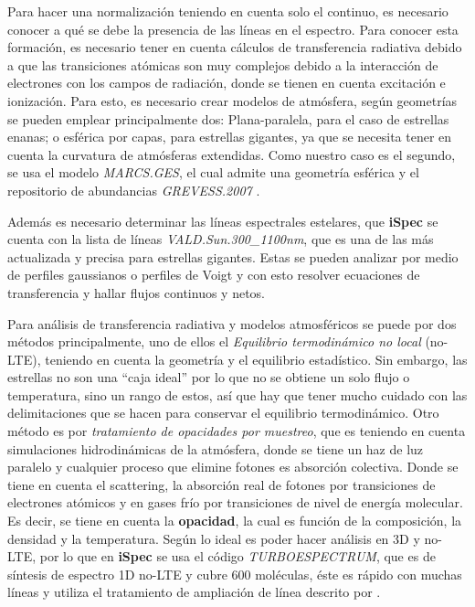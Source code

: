 \documentclass[12pt,oneside,openany,letter]{book}
\begin{document}
Para hacer una normalización teniendo en cuenta solo el continuo, es necesario conocer a qué se debe la presencia de las líneas en el espectro. Para conocer esta formación, es necesario tener en cuenta cálculos de transferencia radiativa debido a que las transiciones atómicas son muy complejos debido a la interacción de electrones con los campos de radiación, donde se tienen en cuenta excitación e ionización. Para esto, es necesario crear modelos de atmósfera, según geometrías se pueden emplear principalmente dos: Plana-paralela, para el caso de estrellas enanas; o esférica por capas, para estrellas gigantes, ya que se necesita tener en cuenta la curvatura de atmósferas extendidas. Como nuestro caso es el segundo, se usa el modelo \textit{MARCS.GES}, el cual admite una geometría esférica y el repositorio de abundancias \textit{GREVESS.2007} \citep{grevesse2007solar}.


Además es necesario determinar las líneas espectrales estelares, que \textbf{iSpec} se cuenta con la lista de líneas \textit{VALD.Sun.300\_1100nm}, que es una de las más actualizada y precisa para estrellas gigantes. Estas se pueden analizar por medio de perfiles gaussianos o perfiles de Voigt y con esto resolver ecuaciones de transferencia y hallar flujos continuos y netos. 


\noindent Para análisis de transferencia radiativa y modelos atmosféricos se puede por dos métodos principalmente, uno de ellos el \textit{Equilibrio termodinámico no local} (no-LTE), teniendo en cuenta la geometría y el equilibrio estadístico. Sin embargo, las estrellas no son una ``caja ideal'' por lo que no se obtiene un solo flujo o temperatura, sino un rango de estos, así que hay que tener mucho cuidado con las delimitaciones que se hacen para conservar el equilibrio termodinámico. Otro método es por \textit{tratamiento de opacidades por muestreo}, que es teniendo en cuenta simulaciones hidrodinámicas de la atmósfera, donde se tiene un haz de luz paralelo y cualquier proceso que elimine fotones es absorción colectiva. Donde se tiene en cuenta el scattering, la absorción real de fotones por transiciones de electrones atómicos y en gases frío por transiciones de nivel de energía molecular. Es decir, se tiene en cuenta la \textbf{opacidad}, la cual es función de la composición, la densidad y la temperatura. Según \citep{steffen2013micro} lo ideal es poder hacer análisis en 3D y no-LTE, por lo que en \textbf{iSpec} se usa el código \textit{TURBOESPECTRUM}, que es de síntesis de espectro 1D no-LTE y cubre 600 moléculas, éste es rápido con muchas líneas y utiliza el tratamiento de ampliación de línea descrito por \citep{plez2012turbospectrum}.
\end{document}
